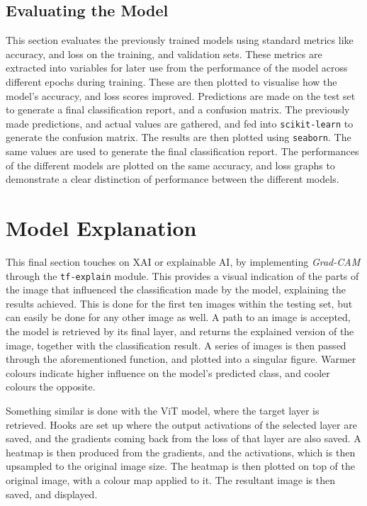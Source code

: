 \documentclass[../main]{subfiles}
\begin{document}
\subsection{Evaluating the Model}
This section evaluates the previously trained models using standard metrics like
accuracy, and loss on the training, and validation sets. These metrics are
extracted into variables for later use from the performance of the model across
different epochs during training. These are then plotted to visualise how the
model's accuracy, and loss scores improved. Predictions are made on the test set
to generate a final classification report, and a confusion matrix. The
previously made predictions, and actual values are gathered, and fed into
\texttt{scikit-learn} to generate the confusion matrix. The results are then
plotted using \texttt{seaborn}. The same values are used to generate the final
classification report. The performances of the different models are plotted on
the same accuracy, and loss graphs to demonstrate a clear distinction
of performance between the different models.
 
\section{Model Explanation}
This final section touches on XAI or explainable AI, by implementing
\emph{Grad-CAM} through the \texttt{tf-explain} module. This provides a visual
indication of the parts of the image that influenced the classification made by
the model, explaining the results achieved. This is done for the first ten
images within the testing set, but can easily be done for any other image as
well. A path to an image is accepted, the model is retrieved by its final
layer, and returns the explained version of the image, together with the
classification result. A series of images is then passed through the
aforementioned function, and plotted into a singular figure. Warmer colours
indicate higher influence on the model's predicted class, and cooler colours
the opposite.

Something similar is done with the ViT model, where the target layer is
retrieved. Hooks are set up where the output activations of the selected layer
are saved, and the gradients coming back from the loss of that layer are also
saved. A heatmap is then produced from the gradients, and the activations,
which is then upsampled to the original image size. The heatmap is then plotted
on top of the original image, with a colour map applied to it. The resultant
image is then saved, and displayed.
\end{document}
